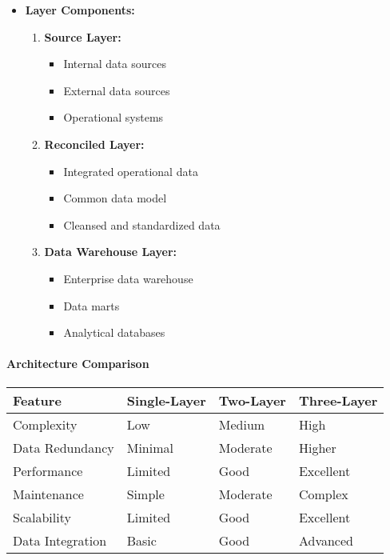 \documentclass[a4paper,11pt]{article}
\begin{document}
\begin{itemize}
    \item \textbf{Layer Components:}
        \begin{enumerate}
            \item \textbf{Source Layer:}
                \begin{itemize}
                    \item Internal data sources
                    \item External data sources
                    \item Operational systems
                \end{itemize}
            \item \textbf{Reconciled Layer:}
                \begin{itemize}
                    \item Integrated operational data
                    \item Common data model
                    \item Cleansed and standardized data
                \end{itemize}
            \item \textbf{Data Warehouse Layer:}
                \begin{itemize}
                    \item Enterprise data warehouse
                    \item Data marts
                    \item Analytical databases
                \end{itemize}
        \end{enumerate}
\end{itemize}

\paragraph{Architecture Comparison}
\begin{center}
\begin{tabular}{|p{3cm}|p{4cm}|p{4cm}|p{4cm}|}
    \hline
    \textbf{Feature} & \textbf{Single-Layer} & \textbf{Two-Layer} & \textbf{Three-Layer} \\
    \hline
    Complexity & Low & Medium & High \\
    \hline
    Data Redundancy & Minimal & Moderate & Higher \\
    \hline
    Performance & Limited & Good & Excellent \\
    \hline
    Maintenance & Simple & Moderate & Complex \\
    \hline
    Scalability & Limited & Good & Excellent \\
    \hline
    Data Integration & Basic & Good & Advanced \\
    \hline
\end{tabular}
\end{center}
\end{document}
